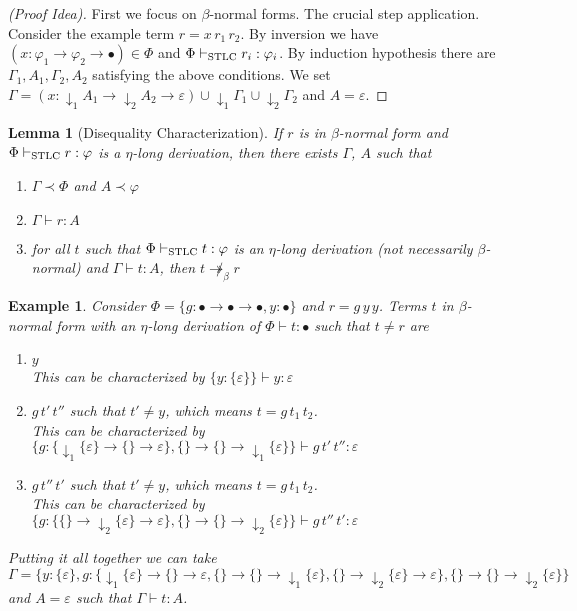 \documentclass[10pt,a4paper]{article}
\theoremstyle{plain}%
\newtheorem{lemma}[theorem]{Lemma}
\newtheorem{example}[theorem]{Example}
\begin{document}
\begin{proof}[(Proof Idea)]
First we focus on $\beta$-normal forms.
The crucial step application.
Consider the example term $r = x\,r_1\,r_2$. By inversion we have $(x : \varphi_1 \to \varphi_2 \to \bullet) \in \Phi$ and $\Phi \vdash_{\textnormal{STLC}} r_i : \varphi_i$.
By induction hypothesis there are $\Gamma_1, A_1, \Gamma_2, A_2$ satisfying the above conditions.
We set $\Gamma = (x : {\downarrow_1} A_1 \to {\downarrow_2} A_2 \to \varepsilon) \cup {\downarrow_1}\Gamma_1 \cup {\downarrow_2}\Gamma_2$
and $A = \varepsilon$.
\end{proof}

\begin{lemma}[Disequality Characterization]
If $r$ is in $\beta$-normal form and $\Phi \vdash_{\textnormal{STLC}} r : \varphi$ is a $\eta$-long derivation, then there exists $\Gamma$, $A$ such that
\begin{enumerate}
\item $\Gamma \prec \Phi$ and $A \prec \varphi$
\item $\Gamma \vdash r : A$
\item for all $t$ such that $\Phi \vdash_{\textnormal{STLC}} t : \varphi$ is an $\eta$-long derivation (not necessarily $\beta$-normal) and $\Gamma \vdash t : A$, then $t \not\twoheadrightarrow_\beta r$
\end{enumerate}
\end{lemma}

\begin{example}
Consider $\Phi = \{g : \bullet \to \bullet \to \bullet, y : \bullet\}$ and $r = g\,y\,y$.
Terms $t$ in $\beta$-normal form with an $\eta$-long derivation of $\Phi \vdash t : \bullet$ such that $t \neq r$ are
\begin{enumerate}
\item $y$\\
This can be characterized by $\{y : \{\varepsilon\}\} \vdash y : \varepsilon$
\item $g\,t'\,t''$ such that $t' \neq y$, which means $t = g\,t_1\,t_2$.\\
This can be characterized by $\{g : \{{\downarrow_1}\{\varepsilon\} \to \{\} \to \varepsilon\}, \{\} \to \{\} \to {\downarrow_1}\{\varepsilon\} \} \vdash g\,t'\,t'' : \varepsilon$
\item $g\,t''\,t'$ such that $t' \neq y$, which means $t = g\,t_1\,t_2$.\\
This can be characterized by $\{g : \{\{\} \to {\downarrow_2}\{\varepsilon\} \to \varepsilon\}, \{\} \to \{\} \to {\downarrow_2}\{\varepsilon\} \} \vdash g\,t''\,t' : \varepsilon$
\end{enumerate}
Putting it all together we can take $\Gamma = \{y : \{\varepsilon\}, g : \{{\downarrow_1}\{\varepsilon\} \to \{\} \to \varepsilon, \{\} \to \{\} \to {\downarrow_1}\{\varepsilon\}, \{\} \to {\downarrow_2}\{\varepsilon\} \to \varepsilon\}, \{\} \to \{\} \to {\downarrow_2}\{\varepsilon\}\}$ and $A = \varepsilon$ such that $\Gamma \vdash t : A$.
\end{example}
\end{document}

